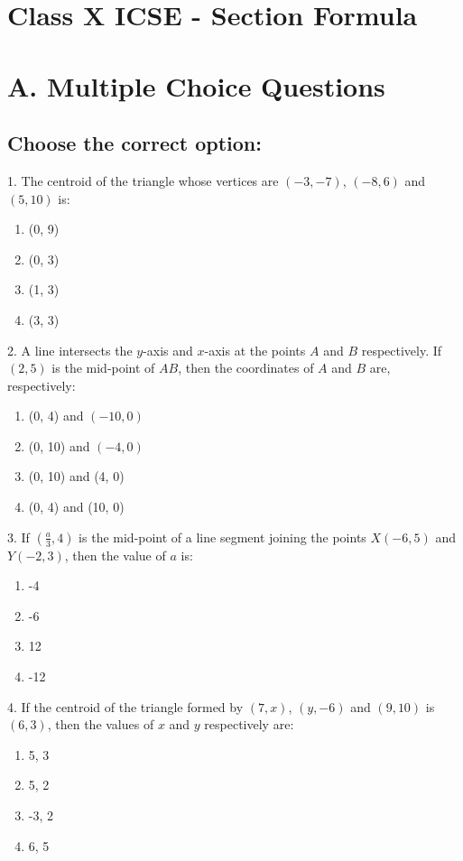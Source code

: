 \documentclass[12pt]{article}
\begin{document}
	\begin{multicols}{2}
	\section*{  Class X ICSE - Section Formula}
	\section*{A. Multiple Choice Questions}
	
	\subsection*{Choose the correct option:}
	
	1. The centroid of the triangle whose vertices are $(-3, -7)$, $(-8, 6)$ and $(5, 10)$ is:
	\begin{enumerate}
		\item (0, 9)
		\item (0, 3)
		\item (1, 3)
		\item (3, 3)
	\end{enumerate}
	
	2. A line intersects the $y$-axis and $x$-axis at the points $A$ and $B$ respectively. If $(2, 5)$ is the mid-point of $AB$, then the coordinates of $A$ and $B$ are, respectively:
	\begin{enumerate}
		\item (0, 4) and $(-10, 0)$
		\item (0, 10) and $(-4, 0)$
		\item (0, 10) and (4, 0)
		\item (0, 4) and (10, 0)
	\end{enumerate}
	
	3. If $\left(\frac{a}{3}, 4\right)$ is the mid-point of a line segment joining the points $X(-6, 5)$ and $Y(-2, 3)$, then the value of $a$ is:
	\begin{enumerate}
		\item -4
		\item -6
		\item 12
		\item -12
	\end{enumerate}
	
	4. If the centroid of the triangle formed by $(7, x)$, $(y, -6)$ and $(9, 10)$ is $(6, 3)$, then the values of $x$ and $y$ respectively are:
	\begin{enumerate}
		\item 5, 3
		\item 5, 2
		\item -3, 2
		\item 6, 5
	\end{enumerate}
	

\end{multicols}
\end{document}
